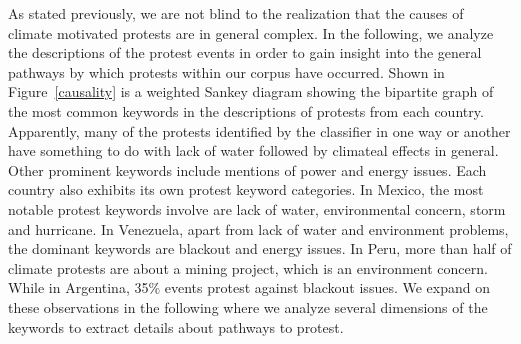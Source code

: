 As stated previously, we are not blind to the realization that the causes of climate motivated protests are in general complex. In the following, we analyze the descriptions of the protest events in order to gain insight into the general pathways by which protests within our corpus have occurred.
Shown in Figure~\ref{causality} is a weighted Sankey diagram showing the bipartite graph of the most common keywords in the descriptions of protests from each country.
Apparently, many of the protests identified by the classifier in one way or another have something to do with lack of water followed by climateal effects in general.
Other prominent keywords include mentions of power and energy issues.
Each country also exhibits its own protest keyword categories.
In Mexico, the most notable protest keywords involve are lack of water, environmental concern, storm and hurricane.
In Venezuela, apart from lack of water and environment problems, the dominant keywords are blackout and energy issues.
In Peru, more than half of climate protests are about a mining project, which is an environment concern.
While in Argentina, 35\% events protest against blackout issues.
We expand on these observations in the following where we analyze several dimensions of the keywords to extract details about pathways to protest.


